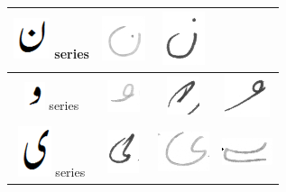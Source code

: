 \begin{table}[h]
\begin{tabular}{@{}cccc@{}}
\hline
\includegraphics[scale=0.15]{noon_orig} series & \includegraphics[scale=0.15]{111} & \includegraphics[scale=0.15]{112} &  \\
\hline
\includegraphics[scale=0.15]{wao_orig} series & \includegraphics[scale=0.15]{113} & \includegraphics[scale=0.15]{114}  & 
\includegraphics[scale=0.15]{115} \\
\hline
\includegraphics[scale=0.15]{choti_ye_orig} series & \includegraphics[scale=0.15]{116} & \includegraphics[scale=0.15]{117} & 
\includegraphics[scale=0.15]{118} \\
\hline
 \end{tabular}
\end{table}

